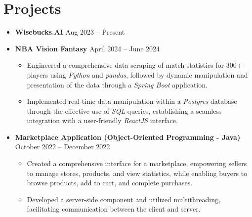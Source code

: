 \documentclass[letterpaper,11pt]{article}
\begin{document}
\section*{Projects}
\begin{itemize}[leftmargin=0.15in, label={}]
\item{
    \textbf{Wisebucks.AI} \hfill Aug 2023 – Present
}

\item{
    \textbf{NBA Vision Fantasy} \hfill April 2024 – June 2024
    \begin{itemize}
        \item Engineered a comprehensive data scraping of match statistics for 300+ players using \textit{Python} and \textit{pandas}, followed by dynamic manipulation and presentation of the data through a \textit{Spring Boot} application.
        \item Implemented real-time data manipulation within a \textit{Postgres} database through the effective use of \textit{SQL} queries, establishing a seamless integration with a user-friendly \textit{ReactJS} interface.
    \end{itemize}
}

\item{
    \textbf{Marketplace Application (Object-Oriented Programming - Java)} \hfill October 2022 – December 2022
    \begin{itemize}
        \item Created a comprehensive interface for a marketplace, empowering sellers to manage stores, products, and view statistics, while enabling buyers to browse products, add to cart, and complete purchases.
        \item Developed a server-side component and utilized multithreading, facilitating communication between the client and server.
    \end{itemize}
}
\end{itemize}
\end{document}
